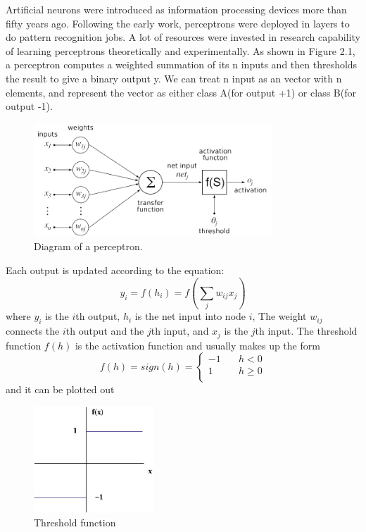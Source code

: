 Artificial neurons were introduced as information processing devices more than fifty years ago\citep{mcculloch1943logical}. Following the early work, perceptrons were deployed in layers to do pattern recognition jobs. A lot of resources were invested in research capability of learning perceptrons theoretically and experimentally. As shown in Figure 2.1, a perceptron computes a weighted summation of its n inputs and then thresholds the result to give a binary output y. We can treat n input as an vector with n elements, and represent the vector as either class A(for output +1) or class B(for output -1).
\graphicspath{ {./Figures/} }
\begin{figure}[!htb]
\centering
\includegraphics[width=0.8\textwidth]{Figure2-1.png}
\caption{\label{fig:perceptron}Diagram of a perceptron.}
\end{figure}

Each output is updated according to the equation:
\begin{equation}\label{eq:BasicEq}
y_{i} = f(h_{i}) = f\left(\sum_{j}w_{ij}x_{j}\right)
\end{equation}
where $y_{i}$ is the $i$th output, $h_{i}$ is the net input into node $i$, The weight $w_{ij}$ connects the $i$th output and the $j$th input, and $x_{j}$ is the $j$th input. The threshold function $f(h)$ is the activation function and usually makes up the form
\begin{equation}\label{eq:FullEq}
f(h) = sign(h) = 
  \begin{cases}
    -1       & \quad h < 0 \\
    1  & \quad h \geq 0\\
  \end{cases}
\end{equation}
and it can be plotted out
\graphicspath{ {./Figures/} }
\begin{figure}[!htb]
\centering
\includegraphics[width=0.4\textwidth]{bipolar-threshold.jpg}
\caption{\label{fig:ThresholdFunc}Threshold function}
\end{figure}

